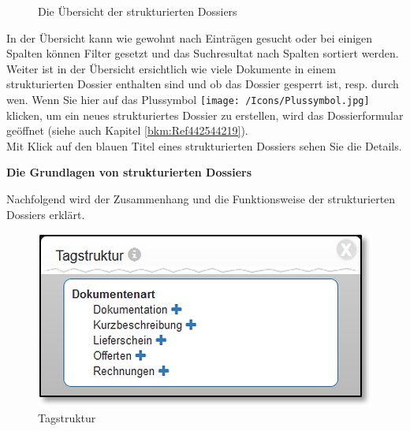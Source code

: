 \begin{figure}[H]
\caption{Die Übersicht der strukturierten Dossiers}
\end{figure}

In der Übersicht kann wie gewohnt nach Einträgen gesucht oder bei einigen Spalten können Filter gesetzt und das Suchresultat nach Spalten sortiert werden. Weiter ist in der Übersicht ersichtlich wie viele Dokumente in einem strukturierten Dossier enthalten sind und ob das Dossier gesperrt ist, resp. durch wen. Wenn Sie hier auf das Plussymbol \texttt{[image: /Icons/Plussymbol.jpg]} klicken, um ein neues strukturiertes Dossier zu erstellen, wird das Dossierformular geöffnet (siehe auch Kapitel \ref{bkm:Ref442544219}).\\

Mit Klick auf den blauen Titel eines strukturierten Dossiers sehen Sie die Details.

\vspace{\baselineskip}

\textbf{Die Grundlagen von strukturierten Dossiers}

Nachfolgend wird der Zusammenhang und die Funktionsweise der strukturierten Dossiers erklärt.

\begin{figure}
  \vspace{-30pt}
  \begin{center}
    \includegraphics[width=1\linewidth]{../chapters/11_Dokumentenablage/pictures/plandos_TagTyp.jpg}
  \end{center}
  \vspace{-20pt}
  \caption{Tagstruktur}
  \vspace{-10pt}
\end{figure}

